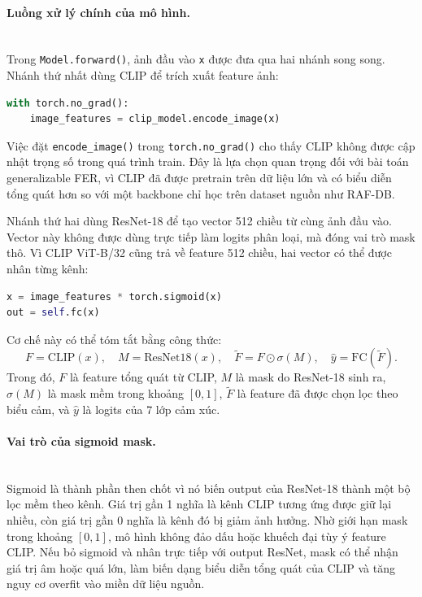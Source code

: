 \paragraph{Luồng xử lý chính của mô hình.}\mbox{}\\
Trong \texttt{Model.forward()}, ảnh đầu vào \texttt{x} được đưa qua hai nhánh song song. Nhánh thứ nhất dùng CLIP để trích xuất feature ảnh:
\begin{lstlisting}[language=Python]
with torch.no_grad():
    image_features = clip_model.encode_image(x)
\end{lstlisting}
Việc đặt \texttt{encode\_image()} trong \texttt{torch.no\_grad()} cho thấy CLIP không được cập nhật trọng số trong quá trình train. Đây là lựa chọn quan trọng đối với bài toán generalizable FER, vì CLIP đã được pretrain trên dữ liệu lớn và có biểu diễn tổng quát hơn so với một backbone chỉ học trên dataset nguồn như RAF-DB.

Nhánh thứ hai dùng ResNet-18 để tạo vector 512 chiều từ cùng ảnh đầu vào. Vector này không được dùng trực tiếp làm logits phân loại, mà đóng vai trò mask thô. Vì CLIP ViT-B/32 cũng trả về feature 512 chiều, hai vector có thể được nhân từng kênh:
\begin{lstlisting}[language=Python]
x = image_features * torch.sigmoid(x)
out = self.fc(x)
\end{lstlisting}
Cơ chế này có thể tóm tắt bằng công thức:
\[
F = \mathrm{CLIP}(x), \quad
M = \mathrm{ResNet18}(x), \quad
\widetilde{F} = F \odot \sigma(M), \quad
\hat{y} = \mathrm{FC}(\widetilde{F}).
\]
Trong đó, \(F\) là feature tổng quát từ CLIP, \(M\) là mask do ResNet-18 sinh ra, \(\sigma(M)\) là mask mềm trong khoảng \([0,1]\), \(\widetilde{F}\) là feature đã được chọn lọc theo biểu cảm, và \(\hat{y}\) là logits của 7 lớp cảm xúc.

\paragraph{Vai trò của sigmoid mask.}\mbox{}\\
Sigmoid là thành phần then chốt vì nó biến output của ResNet-18 thành một bộ lọc mềm theo kênh. Giá trị gần 1 nghĩa là kênh CLIP tương ứng được giữ lại nhiều, còn giá trị gần 0 nghĩa là kênh đó bị giảm ảnh hưởng. Nhờ giới hạn mask trong khoảng \([0,1]\), mô hình không đảo dấu hoặc khuếch đại tùy ý feature CLIP. Nếu bỏ sigmoid và nhân trực tiếp với output ResNet, mask có thể nhận giá trị âm hoặc quá lớn, làm biến dạng biểu diễn tổng quát của CLIP và tăng nguy cơ overfit vào miền dữ liệu nguồn.

